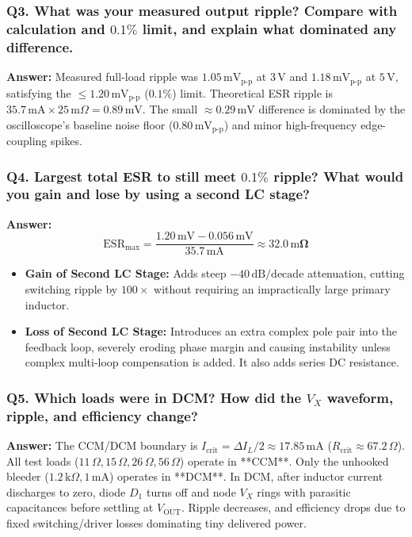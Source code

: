 \documentclass[11pt,a4paper]{article}
\begin{document}
\subsubsection*{Q3. What was your measured output ripple? Compare with calculation and $0.1\%$ limit, and explain what dominated any difference.}
\textbf{Answer:} Measured full-load ripple was $\mathbf{1.05\,\mathrm{mV}_{\mathrm{p\text{-}p}}}$ at $3\,\mathrm{V}$ and $\mathbf{1.18\,\mathrm{mV}_{\mathrm{p\text{-}p}}}$ at $5\,\mathrm{V}$, satisfying the $\le 1.20\,\mathrm{mV}_{\mathrm{p\text{-}p}}$ ($0.1\%$) limit. Theoretical ESR ripple is $35.7\,\mathrm{mA} \times 25\,\mathrm{m}\Omega = 0.89\,\mathrm{mV}$. The small $\approx 0.29\,\mathrm{mV}$ difference is dominated by the oscilloscope's baseline noise floor ($0.80\,\mathrm{mV}_{\mathrm{p\text{-}p}}$) and minor high-frequency edge-coupling spikes.

\subsubsection*{Q4. Largest total ESR to still meet $0.1\%$ ripple? What would you gain and lose by using a second LC stage?}
\textbf{Answer:} 
\begin{equation}
    \mathrm{ESR}_{\mathrm{max}} = \frac{1.20\,\mathrm{mV} - 0.056\,\mathrm{mV}}{35.7\,\mathrm{mA}} \approx \mathbf{32.0\,\mathrm{m}\Omega}
\end{equation}
\begin{itemize}
    \item \textbf{Gain of Second LC Stage:} Adds steep $-40\,\mathrm{dB/decade}$ attenuation, cutting switching ripple by $100\times$ without requiring an impractically large primary inductor.
    \item \textbf{Loss of Second LC Stage:} Introduces an extra complex pole pair into the feedback loop, severely eroding phase margin and causing instability unless complex multi-loop compensation is added. It also adds series DC resistance.
\end{itemize}

\subsubsection*{Q5. Which loads were in DCM? How did the $V_X$ waveform, ripple, and efficiency change?}
\textbf{Answer:} The CCM/DCM boundary is $I_{\mathrm{crit}} = \Delta I_L / 2 \approx 17.85\,\mathrm{mA}$ ($R_{\mathrm{crit}} \approx 67.2\,\Omega$). All test loads ($11\,\Omega, 15\,\Omega, 26\,\Omega, 56\,\Omega$) operate in **CCM**. Only the unhooked bleeder ($1.2\,\mathrm{k}\Omega, 1\,\mathrm{mA}$) operates in **DCM**.
In DCM, after inductor current discharges to zero, diode $D_1$ turns off and node $V_X$ rings with parasitic capacitances before settling at $V_{\mathrm{OUT}}$. Ripple decreases, and efficiency drops due to fixed switching/driver losses dominating tiny delivered power.
\end{document}
